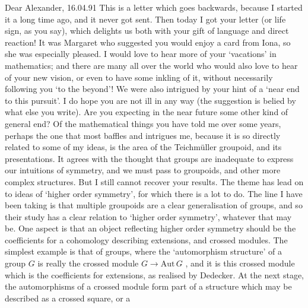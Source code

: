 
Dear Alexander,
16.04.91
This is a letter which goes backwards, because I started it a long time
ago, and it never got sent.  Then today I got your letter (or life sign, as
you say), which delights us both with your gift of language and direct
reaction!  It was Margaret who suggested you would enjoy a card from Iona,
so she was especially pleased.
I would love to hear more of your `vacations' in mathematics; and there
are many all over the world who would also love to hear of your new vision,
or even to have some inkling of it, without necessarily following you `to
the beyond'!
We were also intrigued by your hint of a `near end to this pursuit'.  I
do hope you are not ill in any way (the suggestion is belied by what else
you write).  Are you expecting in the near future some other kind of general
end?
Of the mathematical things you have told me over some years, perhaps
the one that most baffles and intrigues me, because it is so directly
related to some of my ideas, is the area of the Teichm\"uller groupoid, and
its presentations.  It agrees with the thought that groups are inadequate to
express our intuitions of symmetry, and we must pass to groupoids, and other
more complex structures.  But I still cannot recover your results.
The theme has lead on to ideas of `higher order symmetry', for which
there is a lot to do.  The line I have been taking is that multiple
groupoids are a clear generalisation of groups, and so their study has a
clear relation to `higher order symmetry', whatever that may be.  One aspect
is that an object reflecting higher order symmetry should be the
coefficients for a cohomology describing extensions, and crossed modules.
The simplest example is that of groups, where the `automorphism structure'
of a group $G$ is really the crossed module $G \longrightarrow \mathrm{Aut}\, G$ , and it is this
crossed module which is the coefficients for extensions, as realised by
Dedecker.  At the next stage, the automorphisms of a crossed module form
part of a structure which may be described as a crossed square, or a
